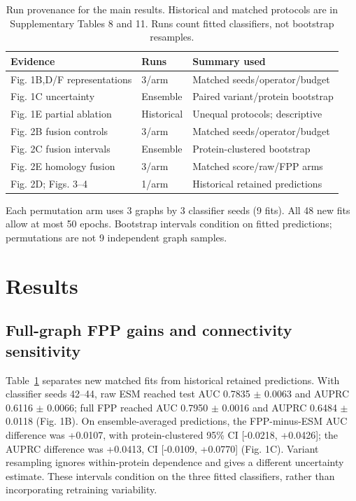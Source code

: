\documentclass[conference]{IEEEtran}
\begin{document}
\begin{table}[t]
\caption{Run provenance for the main results. Historical and matched protocols are in Supplementary Tables 8 and 11. Runs count fitted classifiers, not bootstrap resamples.}
\label{tab:run_sources}
\centering
\footnotesize
\setlength{\tabcolsep}{3pt}
\renewcommand{\arraystretch}{1.12}
\begin{tabular}{p{}p{}p{}}
\hline
Evidence & Runs & Summary used \\
\hline
Fig. 1B,D/F representations & 3/arm & Matched seeds/operator/budget \\
Fig. 1C uncertainty & Ensemble & Paired variant/protein bootstrap \\
Fig. 1E partial ablation & Historical & Unequal protocols; descriptive \\
Fig. 2B fusion controls & 3/arm & Matched seeds/operator/budget \\
Fig. 2C fusion intervals & Ensemble & Protein-clustered bootstrap \\
Fig. 2E homology fusion & 3/arm & Matched score/raw/FPP arms \\
Fig. 2D; Figs. 3--4 & 1/arm & Historical retained predictions \\
\hline
\end{tabular}
\par\smallskip
\raggedright Each permutation arm uses 3 graphs by 3 classifier seeds (9 fits). All 48 new fits allow at most 50 epochs. Bootstrap intervals condition on fitted predictions; permutations are not 9 independent graph samples.
\end{table}

\section{Results}

\subsection{Full-graph FPP gains and connectivity sensitivity}

Table~\ref{tab:run_sources} separates new matched fits from historical retained predictions. With classifier seeds 42--44, raw ESM reached test AUC 0.7835 $\pm$ 0.0063 and AUPRC 0.6116 $\pm$ 0.0066; full FPP reached AUC 0.7950 $\pm$ 0.0016 and AUPRC 0.6484 $\pm$ 0.0118 (Fig. 1B). On ensemble-averaged predictions, the FPP-minus-ESM AUC difference was +0.0107, with protein-clustered 95\% CI [-0.0218, +0.0426]; the AUPRC difference was +0.0413, CI [-0.0109, +0.0770] (Fig. 1C). Variant resampling ignores within-protein dependence and gives a different uncertainty estimate. These intervals condition on the three fitted classifiers, rather than incorporating retraining variability.
\end{document}
